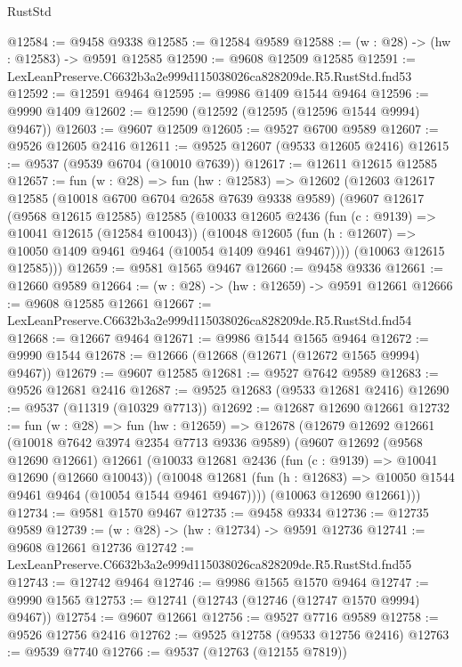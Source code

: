 \begin{lexlean}{RustStd}
\begin{coremodule}
@12584 := @9458 @9338
@12585 := @12584 @9589
@12588 := (w : @28) -> (hw : @12583) -> @9591 @12585
@12590 := @9608 @12509 @12585
@12591 := LexLeanPreserve.C6632b3a2e999d115038026ca828209de.R5.RustStd.fnd53
@12592 := @12591 @9464
@12595 := @9986 @1409 @1544 @9464
@12596 := @9990 @1409
@12602 := @12590 (@12592 (@12595 (@12596 @1544 @9994) @9467))
@12603 := @9607 @12509
@12605 := @9527 @6700 @9589
@12607 := @9526 @12605 @2416
@12611 := @9525 @12607 (@9533 @12605 @2416)
@12615 := @9537 (@9539 @6704 (@10010 @7639))
@12617 := @12611 @12615 @12585
@12657 := fun (w : @28) =>
  fun (hw : @12583) =>
  @12602
    (@12603
      @12617
      @12585
      (@10018 @6700 @6704 @2658 @7639 @9338 @9589)
      (@9607
        @12617
        (@9568 @12615 @12585)
        @12585
        (@10033
          @12605
          @2436
          (fun (c : @9139) => @10041 @12615 (@12584 @10043))
          (@10048 @12605 (fun (h : @12607) => @10050 @1409 @9461 @9464 (@10054 @1409 @9461 @9467))))
        (@10063 @12615 @12585)))
@12659 := @9581 @1565 @9467
@12660 := @9458 @9336
@12661 := @12660 @9589
@12664 := (w : @28) -> (hw : @12659) -> @9591 @12661
@12666 := @9608 @12585 @12661
@12667 := LexLeanPreserve.C6632b3a2e999d115038026ca828209de.R5.RustStd.fnd54
@12668 := @12667 @9464
@12671 := @9986 @1544 @1565 @9464
@12672 := @9990 @1544
@12678 := @12666 (@12668 (@12671 (@12672 @1565 @9994) @9467))
@12679 := @9607 @12585
@12681 := @9527 @7642 @9589
@12683 := @9526 @12681 @2416
@12687 := @9525 @12683 (@9533 @12681 @2416)
@12690 := @9537 (@11319 (@10329 @7713))
@12692 := @12687 @12690 @12661
@12732 := fun (w : @28) =>
  fun (hw : @12659) =>
  @12678
    (@12679
      @12692
      @12661
      (@10018 @7642 @3974 @2354 @7713 @9336 @9589)
      (@9607
        @12692
        (@9568 @12690 @12661)
        @12661
        (@10033
          @12681
          @2436
          (fun (c : @9139) => @10041 @12690 (@12660 @10043))
          (@10048 @12681 (fun (h : @12683) => @10050 @1544 @9461 @9464 (@10054 @1544 @9461 @9467))))
        (@10063 @12690 @12661)))
@12734 := @9581 @1570 @9467
@12735 := @9458 @9334
@12736 := @12735 @9589
@12739 := (w : @28) -> (hw : @12734) -> @9591 @12736
@12741 := @9608 @12661 @12736
@12742 := LexLeanPreserve.C6632b3a2e999d115038026ca828209de.R5.RustStd.fnd55
@12743 := @12742 @9464
@12746 := @9986 @1565 @1570 @9464
@12747 := @9990 @1565
@12753 := @12741 (@12743 (@12746 (@12747 @1570 @9994) @9467))
@12754 := @9607 @12661
@12756 := @9527 @7716 @9589
@12758 := @9526 @12756 @2416
@12762 := @9525 @12758 (@9533 @12756 @2416)
@12763 := @9539 @7740
@12766 := @9537 (@12763 (@12155 @7819))

\end{coremodule}
\end{lexlean}
